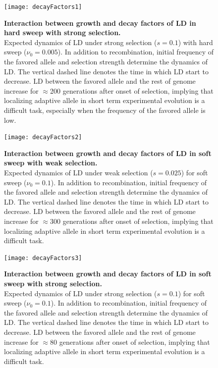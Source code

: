 \begin{figure}[H]
	\centering
	\texttt{[image: decayFactors1]}	
\caption{{\bf Interaction between growth and decay factors of LD in 
hard 
		sweep with	strong selection.}\\
	Expected dynamics of LD under strong selection ($s=0.1$) with hard sweep 
	($\nu_0=0.005$). In addition to 
	recombination, initial frequency of the favored allele and 
	selection 
	strength determine the dynamics of LD. The vertical dashed line 
	denotes 
	the time in which LD start to decrease. LD between the favored 
	allele 
	and the rest of genome increase for 
	$\approx$200 generations after onset of selection, implying that 
	localizing adaptive allele in short 
	term experimental evolution is a difficult task, especially when 
	the 
	frequency of the favored allele is low.} \label{fig:ldf1}
\end{figure}
\begin{figure}[H]
	\centering
	\texttt{[image: decayFactors2]}	
\caption{{\bf Interaction between growth and decay factors of LD in 
soft 
		sweep with	weak selection.}\\
	Expected dynamics of LD under weak selection ($s=0.025$) for soft sweep 
	($\nu_0=0.1$).  In addition to 
	recombination, initial frequency of the favored allele and 
	selection 
	strength determine the dynamics of LD. The vertical dashed line 
	denotes 
	the time in which LD start to decrease. LD between the favored 
	allele 
	and the rest of genome increase for 
	$\approx$300 generations after onset of selection, implying that 
	localizing adaptive allele in short 
	term experimental evolution is a difficult task.} \label{fig:ldf2}
\end{figure}
\begin{figure}[H]
	\centering
	\texttt{[image: decayFactors3]}	
\caption{{\bf Interaction between growth and decay factors of LD in 
soft 
		sweep with	strong selection.}\\
	Expected dynamics of LD under strong selection ($s=0.1$) for soft sweep 
	($\nu_0=0.1$).  In addition to 
	recombination, initial frequency of the favored allele and 
	selection 
	strength determine the dynamics of LD. The vertical dashed line 
	denotes 
	the time in which LD start to decrease. LD between the favored 
	allele 
	and the rest of genome increase for 
	$\approx$80 generations after onset of selection, implying that 
	localizing adaptive allele in short 
	term experimental evolution is a difficult task.} \label{fig:ldf3}
\end{figure}



